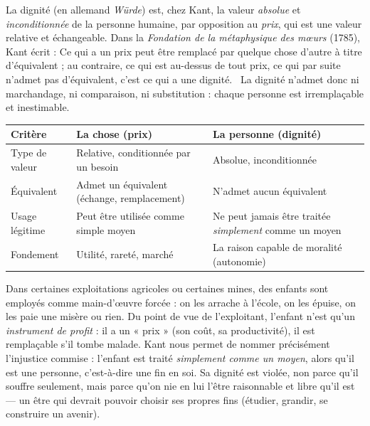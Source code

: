 \documentclass[11pt]{article}
\newcommand{\cle}[1]{{\popxbold\color{popdark}#1}}
\begin{document}
\begin{definition}
La \cle{dignité} (en allemand \emph{Würde}) est, chez Kant, la valeur \emph{absolue} et \emph{inconditionnée} de la personne humaine, par opposition au \emph{prix}, qui est une valeur relative et échangeable. Dans la \emph{Fondation de la métaphysique des mœurs} (1785), Kant écrit : \guillemotleft Ce qui a un prix peut être remplacé par quelque chose d'autre à titre d'équivalent ; au contraire, ce qui est au-dessus de tout prix, ce qui par suite n'admet pas d'équivalent, c'est ce qui a une dignité. \guillemotright\ La dignité n'admet donc ni marchandage, ni comparaison, ni substitution : chaque personne est irremplaçable et inestimable.
\end{definition}

\begin{center}
\begin{tabularx}{\linewidth}{|l|X|X|}
\hline
\rowcolor{popblueL} \textbf{Critère} & \textbf{La chose (prix)} & \textbf{La personne (dignité)} \\
\hline
Type de valeur & Relative, conditionnée par un besoin & Absolue, inconditionnée \\
\hline
Équivalent & Admet un équivalent (échange, remplacement) & N'admet aucun équivalent \\
\hline
Usage légitime & Peut être utilisée comme simple moyen & Ne peut jamais être traitée \emph{simplement} comme un moyen \\
\hline
Fondement & Utilité, rareté, marché & La raison capable de moralité (autonomie) \\
\hline
\end{tabularx}
\end{center}

\begin{exemplebox}
Dans certaines exploitations agricoles ou certaines mines, des enfants sont employés comme main-d'œuvre forcée : on les arrache à l'école, on les épuise, on les paie une misère ou rien. Du point de vue de l'exploitant, l'enfant n'est qu'un \emph{instrument de profit} : il a un « prix » (son coût, sa productivité), il est remplaçable s'il tombe malade. Kant nous permet de nommer précisément l'injustice commise : l'enfant est traité \emph{simplement comme un moyen}, alors qu'il est une personne, c'est-à-dire une fin en soi. Sa dignité est violée, non parce qu'il souffre seulement, mais parce qu'on nie en lui l'être raisonnable et libre qu'il est — un être qui devrait pouvoir choisir ses propres fins (étudier, grandir, se construire un avenir).
\end{exemplebox}
\end{document}
